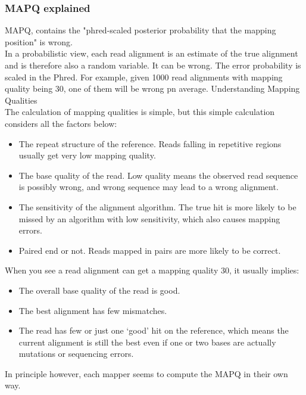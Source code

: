 \documentclass[pdf]{beamer}
\begin{document}
\begin{frame}[allowframebreaks]
\frametitle{MAPQ explained}
MAPQ, contains the "phred-scaled posterior probability that the mapping position" is wrong.\\
\vspace{0.1in}
In a probabilistic view, each read alignment is an estimate of the true alignment and is therefore also a random variable. It can be wrong. The error probability is scaled in the Phred. For example, given 1000 read alignments with mapping quality being 30, one of them will be wrong pn average.
\vspace{0.1in}
Understanding Mapping Qualities\\
\vspace{0.1in}
The calculation of mapping qualities is simple, but this simple calculation considers all the factors below:
\begin{itemize}
\item The repeat structure of the reference. Reads falling in repetitive regions usually get very low mapping quality.
\item The base quality of the read. Low quality means the observed read sequence is possibly wrong, and wrong sequence may lead to a wrong alignment.
\item The sensitivity of the alignment algorithm. The true hit is more likely to be missed by an algorithm with low sensitivity, which also causes mapping errors.
\item Paired end or not. Reads mapped in pairs are more likely to be correct.
\end{itemize}
When you see a read alignment can get a mapping quality 30, it usually implies:\\
\begin{itemize}
\item The overall base quality of the read is good.
\item The best alignment has few mismatches.
\item The read has few or just one `good' hit on the reference, which means the current alignment is still the best even if one or two bases are actually mutations or sequencing errors.
\end{itemize}
\alert{In principle however, each mapper seems to compute the MAPQ in their own way.}
\end{frame}
\end{document}
